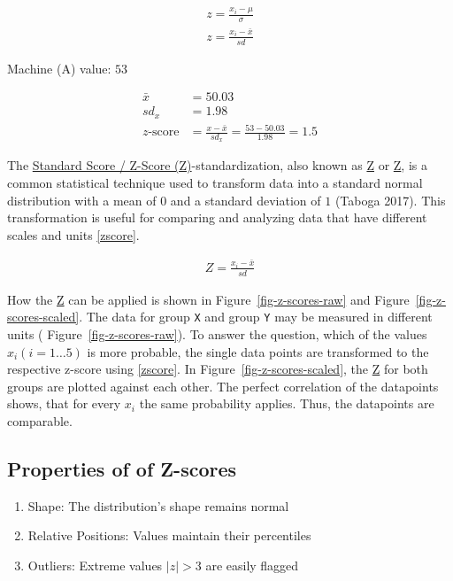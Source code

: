 \documentclass[
  a4paper,
]{scrbook}
\providecommand{\tightlist}{%
  \setlength{\itemsep}{0pt}\setlength{\parskip}{0pt}}\usepackage{longtable,booktabs,array}
\begin{document}
\begin{align}
z = \frac{x_i - \mu}{\sigma} \nonumber \\
z = \frac{x_i - \bar{x}}{sd} \nonumber
\end{align}

Machine (A) value: \(53\)

\begin{align}
\bar{x} &= 50.03 \nonumber \\
sd_{x} &= 1.98 \nonumber \\
z\text{-score} &= \frac{x-\bar{x}}{sd_x} = \frac{53-50.03}{1.98} = 1.5 \nonumber
\end{align}

The \hyperref[acronyms_Z]{Standard Score / Z-Score (Z)}-standardization,
also known as \hyperref[acronyms_Z]{Z} or \hyperref[acronyms_Z]{Z}, is a
common statistical technique used to transform data into a standard
normal distribution with a mean of \(0\) and a standard deviation of
\(1\) (Taboga 2017). This transformation is useful for comparing and
analyzing data that have different scales and units \eqref{zscore}.

\begin{align}
Z = \frac{x_i - \bar{x}}{sd} \label{zscore}
\end{align}

How the \hyperref[acronyms_Z]{Z} can be applied is shown in
Figure~\ref{fig-z-scores-raw} and Figure~\ref{fig-z-scores-scaled}. The
data for group \texttt{X} and group \texttt{Y} may be measured in
different units ( Figure~\ref{fig-z-scores-raw}). To answer the
question, which of the values \(x_i (i=1\ldots5)\) is more probable, the
single data points are transformed to the respective z-score using
\eqref{zscore}. In Figure~\ref{fig-z-scores-scaled}, the
\hyperref[acronyms_Z]{Z} for both groups are plotted against each other.
The perfect correlation of the datapoints shows, that for every \(x_i\)
the same probability applies. Thus, the datapoints are comparable.

\subsection{Properties of of Z-scores}\label{properties-of-of-z-scores}

\begin{enumerate}
\def\labelenumi{\arabic{enumi}.}
\tightlist
\item
  Shape: The distribution's shape remains normal
\item
  Relative Positions: Values maintain their percentiles
\item
  Outliers: Extreme values \(|z|>3\) are easily flagged
\end{enumerate}
\end{document}
